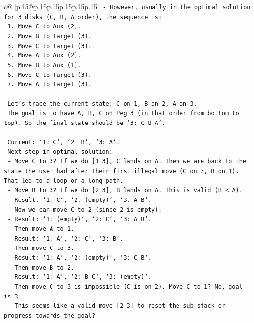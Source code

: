 \documentclass{article}
\begin{document}
{\begin{supertabular}{c@{$\;$}|p{.15\linewidth}@{}p{.15\linewidth}p{.15\linewidth}p{.15\linewidth}p{.15\linewidth}p{.15\linewidth}}
{{{\texttt{  {-} However, usually in the optimal solution for 3 disks (C, B, A order), the sequence is:} \\
\texttt{    1. Move C to Aux (2).} \\
\texttt{    2. Move B to Target (3).} \\
\texttt{    3. Move C to Target (3).} \\
\texttt{    4. Move A to Aux (2).} \\
\texttt{    5. Move B to Aux (1).} \\
\texttt{    6. Move C to Target (3).} \\
\texttt{    7. Move A to Target (3).} \\
\\ 
\texttt{  Let's trace the current state: C on 1, B on 2, A on 3.} \\
\texttt{  The goal is to have A, B, C on Peg 3 (in that order from bottom to top). So the final state should be `3: C B A`.} \\
\\ 
\texttt{  Current: `1: C`, `2: B`, `3: A`.} \\
\texttt{  Next step in optimal solution:} \\
\texttt{  {-} Move C to 3? If we do {[}1 3{]}, C lands on A. Then we are back to the state the user had after their first illegal move (C on 3, B on 1). That led to a loop or a long path.} \\
\texttt{  {-} Move B to 3? If we do {[}2 3{]}, B lands on A. This is valid (B < A).} \\
\texttt{    {-} Result: `1: C`, `2: (empty)`, `3: A B`.} \\
\texttt{    {-} Now we can move C to 2 (since 2 is empty).} \\
\texttt{    {-} Result: `1: (empty)`, `2: C`, `3: A B`.} \\
\texttt{    {-} Then move A to 1.} \\
\texttt{    {-} Result: `1: A`, `2: C`, `3: B`.} \\
\texttt{    {-} Then move C to 3.} \\
\texttt{    {-} Result: `1: A`, `2: (empty)`, `3: C B`.} \\
\texttt{    {-} Then move B to 2.} \\
\texttt{    {-} Result: `1: A`, `2: B C`, `3: (empty)`.} \\
\texttt{    {-} Then move C to 3 is impossible (C is on 2). Move C to 1? No, goal is 3.} \\
\texttt{    {-} This seems like a valid move {[}2 3{]} to reset the sub{-}stack or progress towards the goal?} \\
}}}
\end{supertabular}}
\end{document}
